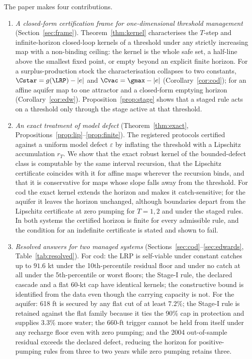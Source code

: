 The paper makes four contributions.

\begin{enumerate}[leftmargin=2em]
\item \emph{A closed-form certification frame for one-dimensional threshold management} (Section~\ref{sec:frame}). Theorem~\ref{thm:kernel} characterises the $T$-step and infinite-horizon closed-loop kernels of a threshold under any strictly increasing map with a non-binding ceiling: the kernel is the whole safe set, a half-line above the smallest fixed point, or empty beyond an explicit finite horizon. For a surplus-production stock the characterisation collapses to two constants, $\Cstar=g(\LRP)-|e|$ and $\Cvac=\gmax-|e|$ (Corollary~\ref{cor:cod}); for an affine aquifer map to one attractor and a closed-form emptying horizon (Corollary~\ref{cor:edw}). Proposition~\ref{prop:stage} shows that a staged rule acts on a threshold only through the stage active at that threshold.
\item \emph{An exact treatment of model defect} (Theorem~\ref{thm:exact}, Propositions~\ref{prop:lip}--\ref{prop:finite}). The registered protocols certified against a uniform model defect $\varepsilon$ by inflating the threshold with a Lipschitz accumulation $r_T$. We show that the exact robust kernel of the bounded-defect class is computable by the same interval recursion, that the Lipschitz certificate coincides with it for affine maps wherever the recursion binds, and that it is conservative for maps whose slope falls away from the threshold. For cod the exact kernel extends the horizon and makes it catch-sensitive; for the aquifer it leaves the horizon unchanged, although boundaries depart from the Lipschitz certificate at zero pumping for $T=1,2$ and under the staged rules. In both systems the certified horizon is finite for every admissible rule, and the condition for an indefinite certificate is stated and shown to fail.
\item \emph{Resolved answers for two managed systems} (Sections~\ref{sec:cod}--\ref{sec:edwards}, Table~\ref{tab:resolved}). For cod: the LRP is self-viable under constant catches up to $91.6$ kt under the 10th-percentile residual floor and under no catch at all under the 5th-percentile or worst floors; the Stage-I rule, the declared cascade and a flat 60-kt cap have identical kernels; the constructive bound is identified from the data even though the carrying capacity is not. For the aquifer: 618 ft is secured by any flat cut of at least $7.2\%$; the Stage-I rule is retained against the flat family because it ties the 90\% cap in protection and supplies $3.3\%$ more water; the 660-ft trigger cannot be held from itself under any recharge floor even with zero pumping; and the 2004 out-of-sample residual exceeds the declared defect, reducing the horizon for positive-pumping rules from three to two years while zero pumping retains three.

\end{enumerate}
